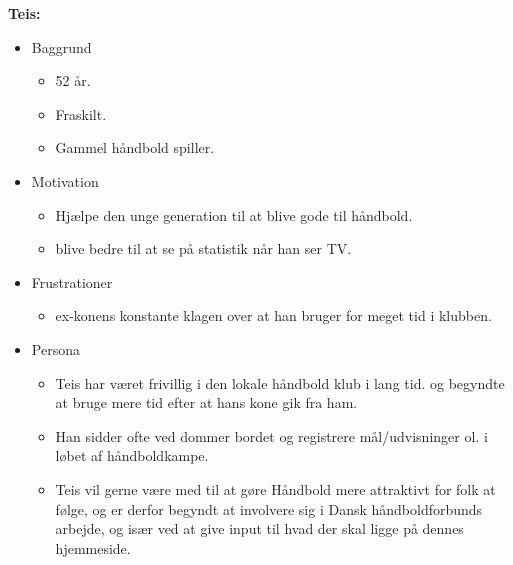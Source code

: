 \newpage
\textbf{Teis:}
\begin{itemize}
\item 	Baggrund
	\begin{itemize}
	\item 52 år.
	\item Fraskilt.
	\item Gammel håndbold spiller.
  	\end{itemize}	
\item Motivation
	\begin{itemize}
	\item Hjælpe den unge generation til at blive gode til håndbold.
	\item blive bedre til at se på statistik når han ser TV.
	\end{itemize}
\item Frustrationer
	\begin{itemize}
	\item ex-konens konstante klagen over at han bruger for meget tid i klubben.
	\end{itemize}
\item Persona
	\begin{itemize}
	\item Teis har været frivillig i den lokale håndbold klub i lang tid. og begyndte at bruge mere tid efter at hans kone gik fra ham.
	\item Han sidder ofte ved dommer bordet og registrere mål/udvisninger ol. i løbet af håndboldkampe.
	\item Teis vil gerne være med til at gøre Håndbold mere attraktivt for folk at følge, og er derfor begyndt at involvere sig i Dansk håndboldforbunds arbejde, og især ved at give input til hvad der skal ligge på dennes hjemmeside.
	\end{itemize}
\end {itemize}
